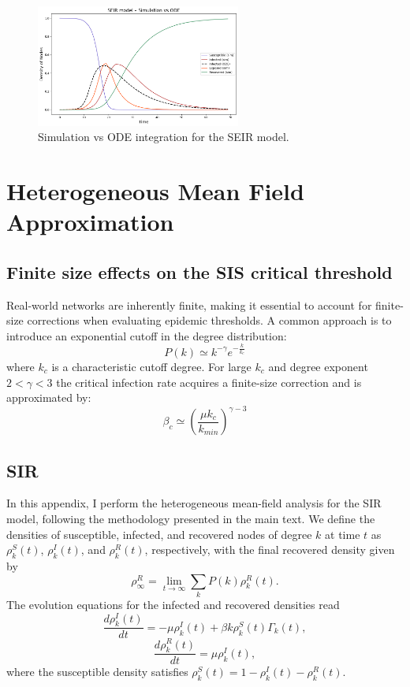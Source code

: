 \begin{figure}[H]
\centering
\includegraphics[width=0.6\textwidth]{images/Homogeneous/SEIR_densities.png}
\caption{Simulation vs ODE integration for the SEIR model.}
\label{fig:seir_compare}
\end{figure}

\medskip

\section{Heterogeneous Mean Field Approximation}

\label{app:Heterogeneous_MF}

\subsection{Finite size effects on the SIS critical threshold}
Real-world networks are inherently finite, making it essential to account for finite-size corrections when evaluating epidemic thresholds. A common approach is to introduce an exponential cutoff in the degree distribution: $$P(k) \simeq
k^{-\gamma}e^{-\frac{k}{k_c}}$$
where $k_c$ is a characteristic cutoff degree.
For large $k_c$ and degree exponent $2< \gamma < 3$ the critical infection rate acquires a finite-size correction and is approximated by:
$$\beta_c \simeq \left(\frac{\mu k_c}{k_{min}}\right)^{\gamma-3}$$

\subsection{SIR}

In this appendix, I perform the heterogeneous mean-field analysis for the SIR model, following the methodology presented in the main text.  
We define the densities of susceptible, infected, and recovered nodes of degree \(k\) at time \(t\) as \(\rho_k^S(t)\), \(\rho_k^I(t)\), and \(\rho_k^R(t)\), respectively, with the final recovered density given by  
\[
\rho_\infty^R = \lim_{t \to \infty} \sum_k P(k) \rho_k^R(t).
\]  
The evolution equations for the infected and recovered densities read  
\[
\frac{d\rho_k^I(t)}{dt} = -\mu \rho_k^I(t) + \beta k \rho_k^S(t) \Gamma_k(t),
\]
\[
\frac{d\rho_k^R(t)}{dt} = \mu \rho_k^I(t),
\]
where the susceptible density satisfies \(\rho_k^S(t) = 1 - \rho_k^I(t) - \rho_k^R(t)\).  

